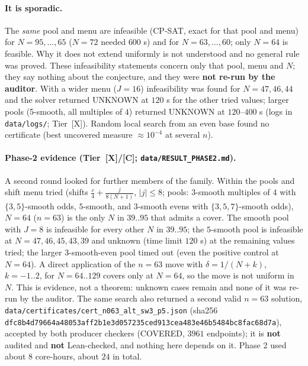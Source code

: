 \documentclass[10pt]{article}
\newcommand{\tier}[1]{\textsf{[#1]}}
\newcommand{\tC}{\tier{C}}
\newcommand{\tX}{\tier{X}}
\begin{document}
\paragraph{It is sporadic.} The \emph{same} pool and menu are infeasible (CP-SAT, exact for that pool and menu) for $N=95,\dots,65$ ($N=72$ needed $600$ s) and for $N=63,\dots,60$; only $N=64$ is feasible. Why it does not extend uniformly is not understood and no general rule was proved. These infeasibility statements concern only that pool, menu and $N$; they say nothing about the conjecture, and they were \textbf{not re-run by the auditor}. With a wider menu ($J=16$) infeasibility was found for $N=47,46,44$ and the solver returned UNKNOWN at $120$ s for the other tried values; larger pools (5-smooth, all multiples of $4$) returned UNKNOWN at $120$--$400$ s (logs in \texttt{data/logs/}; Tier~\tX{}). Random local search from an even base found no certificate (best uncovered measure $\approx10^{-4}$ at several $n$).
\paragraph{Phase-2 evidence (Tier~\tX{}/\tC{}; \texttt{data/RESULT\_PHASE2.md}).} A second round looked for further members of the family. Within the pools and shift menu tried (shifts $\frac c4+\frac j{8(N+1)}$, $|j|\le8$; pools: $3$-smooth multiples of $4$ with $\{3,5\}$-smooth odds, $5$-smooth, and $3$-smooth evens with $\{3,5,7\}$-smooth odds), $N=64$ ($n=63$) is the only $N$ in $39..95$ that admits a cover. The smooth pool with $J=8$ is infeasible for every other $N$ in $39..95$; the $5$-smooth pool is infeasible at $N=47,46,45,43,39$ and unknown (time limit $120$ s) at the remaining values tried; the larger $3$-smooth-even pool timed out (even the positive control at $N=64$). A direct application of the $n=63$ move with $\delta=1/(N+k)$, $k=-1..2$, for $N=64..129$ covers only at $N=64$, so the move is not uniform in $N$. This is evidence, not a theorem: unknown cases remain and none of it was re-run by the auditor. The same search also returned a second valid $n=63$ solution, \texttt{data/certificates/cert\_n063\_alt\_sw3\_p5.json} (sha256 \texttt{dfc8b4d79664a48053aff2b1e3d057235ced913cea483e46b5484bc8fac68d7a}), accepted by both producer checkers (COVERED, $3961$ endpoints); it is \textbf{not} audited and \textbf{not} Lean-checked, and nothing here depends on it. Phase 2 used about $8$ core-hours, about $24$ in total.

\end{document}
